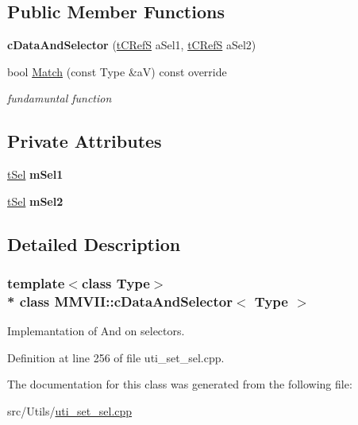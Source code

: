 \subsection*{Public Member Functions}
\begin{DoxyCompactItemize}
\item 
{\bfseries c\+Data\+And\+Selector} (\hyperlink{classMMVII_1_1cSelector}{t\+C\+RefS} a\+Sel1, \hyperlink{classMMVII_1_1cSelector}{t\+C\+RefS} a\+Sel2)\hypertarget{classMMVII_1_1cDataAndSelector_aa80386187de6c44bde1da113cc42786c}{}\label{classMMVII_1_1cDataAndSelector_aa80386187de6c44bde1da113cc42786c}

\item 
bool \hyperlink{classMMVII_1_1cDataAndSelector_a7b964126863b463f924dd647c65ed0ef}{Match} (const Type \&aV) const override\hypertarget{classMMVII_1_1cDataAndSelector_a7b964126863b463f924dd647c65ed0ef}{}\label{classMMVII_1_1cDataAndSelector_a7b964126863b463f924dd647c65ed0ef}

\begin{DoxyCompactList}\small\item\em fundamuntal function \end{DoxyCompactList}\end{DoxyCompactItemize}
\subsection*{Private Attributes}
\begin{DoxyCompactItemize}
\item 
\hyperlink{classMMVII_1_1cSelector}{t\+Sel} {\bfseries m\+Sel1}\hypertarget{classMMVII_1_1cDataAndSelector_a723a64703ae1a6a494ea93be4adbda51}{}\label{classMMVII_1_1cDataAndSelector_a723a64703ae1a6a494ea93be4adbda51}

\item 
\hyperlink{classMMVII_1_1cSelector}{t\+Sel} {\bfseries m\+Sel2}\hypertarget{classMMVII_1_1cDataAndSelector_adb6e58101e0c9620ae20068b17d68e94}{}\label{classMMVII_1_1cDataAndSelector_adb6e58101e0c9620ae20068b17d68e94}

\end{DoxyCompactItemize}


\subsection{Detailed Description}
\subsubsection*{template$<$class Type$>$\\*
class M\+M\+V\+I\+I\+::c\+Data\+And\+Selector$<$ Type $>$}

Implemantation of And on selectors. 

Definition at line 256 of file uti\+\_\+set\+\_\+sel.\+cpp.



The documentation for this class was generated from the following file\+:\begin{DoxyCompactItemize}
\item 
src/\+Utils/\hyperlink{uti__set__sel_8cpp}{uti\+\_\+set\+\_\+sel.\+cpp}\end{DoxyCompactItemize}
